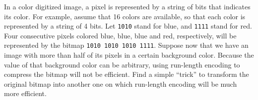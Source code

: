 In a color digitized image, a pixel is represented by a string of bits
that indicates its color.  For example, assume that 16 colors are
available, so that each color is represented by a string of 4 bits.
Let {\tt 1010} stand for blue, and {\tt 1111} stand for red.  Four
consecutive pixels colored blue, blue, blue and red, respectively, will
be represented by the bitmap {\tt 1010 1010 1010 1111}. Suppose now
that we have an image with more than half of its pixels in a certain
background color.  Because the value of that background color can be
arbitrary, using run-length encoding to compress the bitmap will not be
efficient.  Find a simple ``trick'' to transform the original bitmap
into another one on which run-length encoding will be much more
efficient.
